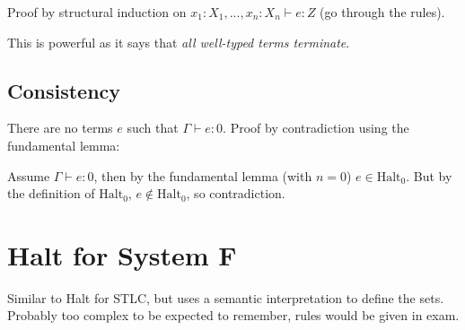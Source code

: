 \documentclass[11pt]{article}
\begin{document}
{{        Proof by structural induction on \(x_1:X_1,...,x_n:X_n \vdash e : Z\) (go through the rules).

        This is powerful as it says that \textit{all well-typed terms terminate}.

    }
    \subsection*{Consistency}
    {
        There are no terms \(e\) such that \(\Gamma\vdash e : 0\). Proof by contradiction using the fundamental lemma:

        Assume \(\Gamma\vdash e : 0\), then by the fundamental lemma (with \(n=0\)) \(e \in \text{Halt}_0\). But by the
        definition of \(\text{Halt}_0\), \(e\notin\text{Halt}_0\), so contradiction.

    }
}
\section{Halt for System F}
{

    Similar to Halt for STLC, but uses a semantic interpretation to define the sets. Probably too complex to be expected
    to remember, rules would be given in exam.

}
\end{document}
